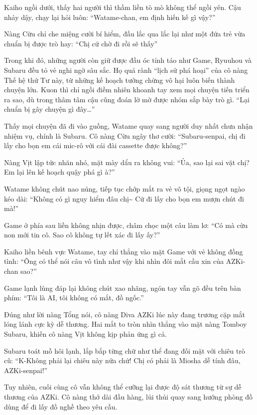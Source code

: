 \documentclass[../main.tex]{subfiles}
\begin{document}
Kaiho ngồi dưới, thấy hai người thì thầm liền tò mò không thể ngồi yên. Cậu nhảy dậy, chạy lại hỏi luôn: ``Watame-chan, em định hiến kế gì vậy?''

Nàng Cừu chỉ che miệng cười bí hiểm, đầu lắc qua lắc lại như một đứa trẻ vừa chuẩn bị được trò hay: ``Chị cứ chờ đi rồi sẽ thấy''

Trong khi đó, những người còn giữ được đầu óc tỉnh táo như Game, Ryuuhou và Subaru đều tỏ vẻ nghi ngờ sâu sắc. Họ quá rành ``lịch sử phá hoại'' của cô nàng Thế hệ thứ Tư này, từ những kế hoạch tưởng chừng vô hại luôn biến thành chuyện lớn. Kuon thì chỉ ngồi điềm nhiên khoanh tay xem mọi chuyện tiến triển ra sao, dù trong thâm tâm cậu cũng đoán lờ mờ được nhóm sắp bày trò gì. ``Lại chuẩn bị gây chuyện gì đây\dots''

Thấy mọi chuyện đã đi vào guồng, Watame quay sang người duy nhất chưa nhận nhiệm vụ, chính là Subaru. Cô nàng Cừu ngây thơ cười: ``Subaru-senpai, chị đi lấy cho bọn em cái mic-rô với cái đài cassette được không?''

Nàng Vịt lập tức nhăn nhó, mặt mày dẩu ra không vui: ``Ủa, sao lại sai vặt chị? Em lại lên kế hoạch quậy phá gì à?''

Watame không chút nao núng, tiếp tục chớp mắt ra vẻ vô tội, giọng ngọt ngào kéo dài: ``Không có gì nguy hiểm đâu chị\~{} Cứ đi lấy cho bọn em mượn chút đi mà!''

Game ở phía sau liền không nhịn được, châm chọc một câu làm lơ: ``Có mà cừu non mới tin cô. Sao cô không tự lết xác đi lấy ấy?''

Kaiho liền bênh vực Watame, tay chỉ thẳng vào mặt Game với vẻ không đồng tình: ``Ông có thể nói câu vô tình như vậy khi nhìn đôi mắt cầu xin của AZKi-chan sao?''

Game lạnh lùng đáp lại không chút xao nhãng, ngón tay vẫn gõ đều trên bàn phím: ``Tôi là AI, tôi không có mắt, đồ ngốc.''

Đúng như lời nàng Tổng nói, cô nàng Diva AZKi lúc này đang trương cặp mắt lóng lánh cực kỳ dễ thương. Hai mắt to tròn nhìn thẳng vào mặt nàng Tomboy Subaru, khiến cô nàng Vịt không kịp phản ứng gì cả.

Subaru toát mồ hôi lạnh, lắp bắp từng chữ như thể đang đối mặt với chiêu trò cũ: ``K-Không phải lại chiêu này nữa chứ! Chị có phải là Miosha dễ tính đâu, AZKi-senpai!''

Tuy nhiên, cuối cùng cô vẫn không thể cưỡng lại được độ sát thương từ sự dễ thương của AZKi. Cô nàng thở dài đầu hàng, lủi thủi quay sang hướng phòng đồ dùng để đi lấy đồ nghề theo yêu cầu.
\end{document}

